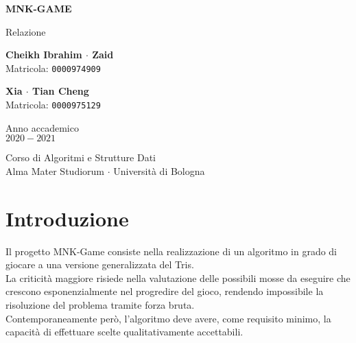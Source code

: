 \documentclass[11pt]{article}
\begin{document}
\begin{titlepage}
    \begin{center}
        \vspace*{1.5cm}
            
        \Huge
        \textbf{MNK-GAME}
            
        \vspace{0.5cm}
        \LARGE
        Relazione
            
        \vspace{1.5cm}
          
        \begin{minipage}[t]{0.47\textwidth}
        \begin{center}
        	{\large{\bf Cheikh Ibrahim $\cdot$ Zaid}}\\
			{\large Matricola: \texttt{0000974909}}
        \end{center}

		\end{minipage}
		\hfill
		\begin{minipage}[t]{0.47\textwidth}\raggedleft
		\begin{center}
        	{\large{\bf Xia $\cdot$ Tian Cheng}}\\
			{\large Matricola: \texttt{0000975129}}
        \end{center}
		\end{minipage}  
            
        \vspace{6cm}
            
        Anno accademico\\
        $2020 - 2021$
            
        \vspace{0.8cm}
            
            
        \Large
        Corso di Algoritmi e Strutture Dati\\
        Alma Mater Studiorum $\cdot$ Università di Bologna\\
            
    \end{center}
\end{titlepage}
\pagebreak


\section*{Introduzione}
\justify
Il progetto MNK-Game consiste nella realizzazione di un algoritmo in grado di giocare a una versione generalizzata del Tris.\\
La criticità maggiore risiede nella valutazione delle possibili mosse da eseguire che crescono esponenzialmente nel progredire del gioco, rendendo impossibile la risoluzione del problema tramite forza bruta.\\
Contemporaneamente però, l'algoritmo deve avere, come requisito minimo, la capacità di effettuare scelte qualitativamente accettabili.
\end{document}
